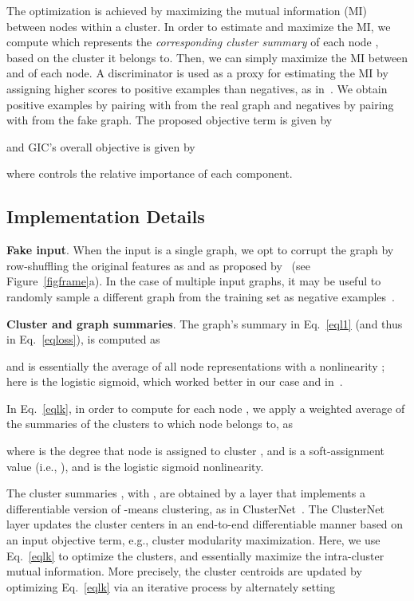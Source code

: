 \documentclass{article}
\begin{document}
The optimization is achieved by maximizing the mutual information (MI) between nodes within a cluster. In order to estimate and maximize the MI, we compute  which represents the \emph{corresponding cluster summary} of each node , based on the cluster it belongs to. Then, we can simply maximize the MI between  and  of each node. A discriminator  is used as a proxy for estimating the MI by assigning higher scores to positive examples than negatives, as in~\cite{velickovic2018deep, hjelm2018learning}. We obtain positive examples by pairing  with  from the real graph and negatives by pairing  with  from the fake graph. The proposed objective term is given by

and GIC's overall objective is given by 

where  controls the relative importance of each component.



\subsection{Implementation Details}

\textbf{Fake input}. When the input is a single graph, we opt to corrupt the graph by row-shuffling the original features   as  and  as proposed by~\cite{velickovic2018deep} (see Figure~\ref{figframe}a). In the case of multiple input  graphs, it may be useful to randomly sample a different graph from the training set as negative examples~\cite{velickovic2018deep}.

\noindent
\textbf{Cluster and graph summaries}. The graph's summary  in Eq.~\eqref{eql1} (and thus in Eq.~\eqref{eqloss}), is computed as

and is essentially the average of all node representations with a nonlinearity ; here is the logistic sigmoid, which worked better in our case and in~\cite{velickovic2018deep}.

In Eq.~\eqref{eqlk}, in order to compute  for each node , we apply a weighted average of the summaries of the  clusters to which node  belongs to, as

where  is the degree that node  is assigned to cluster , and is a soft-assignment value  (i.e., ), and  is the logistic sigmoid nonlinearity. 

The cluster summaries , with , are obtained by a layer that implements a differentiable version of -means clustering, as in  ClusterNet~\cite{wilder2019end}. The ClusterNet layer updates the cluster centers in an end-to-end differentiable manner based on an input objective term, e.g., cluster modularity maximization. Here, we use Eq.~\eqref{eqlk} to optimize the clusters, and essentially maximize the intra-cluster mutual information. 
More precisely, the cluster centroids  are updated by optimizing Eq.~\eqref{eqlk} via an iterative process by alternately setting
\end{document}
